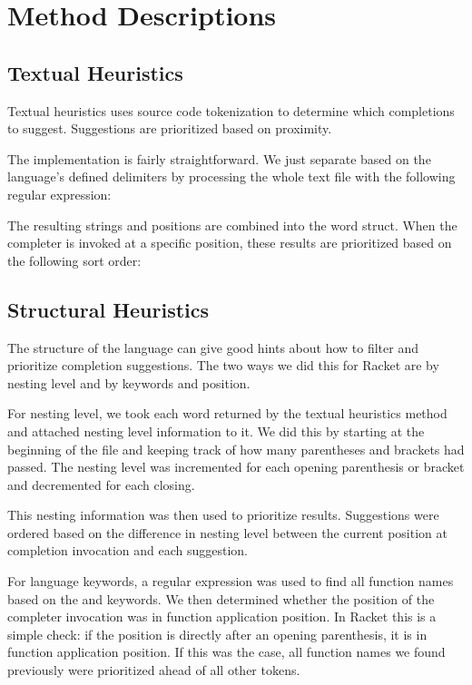 \documentclass[ms,electronic,twosidetoc,letterpaper,chaptercenter,parttop,lol,lof,lot]{byumsphd}
\begin{document}
\section{Method Descriptions}

\subsection{Textual Heuristics}

Textual heuristics uses source code tokenization to determine which completions to suggest.
Suggestions are prioritized based on proximity.

The implementation is fairly straightforward.
We just separate based on the language's defined delimiters by processing the whole text file with the following regular expression: \scheme{[^\s()[]",'`#|\;]+}

The resulting strings and positions are combined into the word struct.
When the completer is invoked at a specific position, these results are prioritized based on the following sort order:


\subsection{Structural Heuristics}

The structure of the language can give good hints about how to filter and prioritize completion suggestions.
The two ways we did this for Racket are by nesting level and by keywords and position.

For nesting level, we took each word returned by the textual heuristics method and attached nesting level information to it.
We did this by starting at the beginning of the file and keeping track of how many parentheses and brackets had passed.
The nesting level was incremented for each opening parenthesis or bracket and decremented for each closing.

This nesting information was then used to prioritize results.
Suggestions were ordered based on the difference in nesting level between the current position at completion invocation and each suggestion.

For language keywords, a regular expression was used to find all function names based on the  and  keywords.
We then determined whether the position of the completer invocation was in function application position.
In Racket this is a simple check: if the position is directly after an opening parenthesis, it is in function application position.
If this was the case, all function names we found previously were prioritized ahead of all other tokens.
\end{document}
